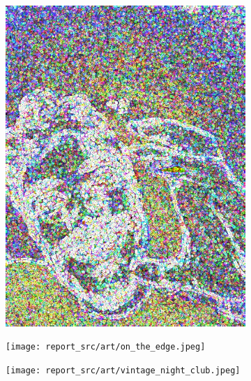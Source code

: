 \documentclass[12pt, a4paper]{article}
\begin{document}
\begin{figure}[!h]
\begin{subfigure}[b]{0.3\textwidth}
        \includegraphics[width=1\textwidth]{report_src/art/monet.jpeg}
    \end{subfigure}
    \begin{subfigure}[b]{0.3\textwidth}
      \texttt{[image: report\_src/art/on\_the\_edge.jpeg]}
  \end{subfigure}
  \begin{subfigure}[b]{0.3\textwidth}
    \texttt{[image: report\_src/art/vintage\_night\_club.jpeg]}
\end{subfigure}
\begin{subfigure}[b]{0.3\textwidth}

\end{subfigure}
\end{figure}
\end{document}
